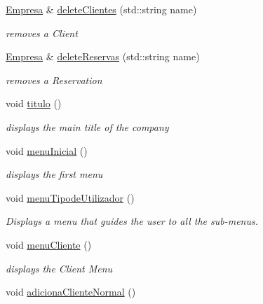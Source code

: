 \begin{DoxyCompactItemize}
\hyperlink{classEmpresa}{Empresa} \& \hyperlink{classEmpresa_a52b9f4d94c2a05704d74854ed4dd1590}{delete\+Clientes} (std\+::string name)
\begin{DoxyCompactList}\small\item\em removes a Client \end{DoxyCompactList}\item 
\hyperlink{classEmpresa}{Empresa} \& \hyperlink{classEmpresa_a079c008b006f56faac3c1016fe770e8c}{delete\+Reservas} (std\+::string name)
\begin{DoxyCompactList}\small\item\em removes a Reservation \end{DoxyCompactList}\item 
void \hyperlink{classEmpresa_ad79f7196a8ce7256771cbd7b9542155c}{titulo} ()
\begin{DoxyCompactList}\small\item\em displays the main title of the company \end{DoxyCompactList}\item 
\mbox{\label{classEmpresa_ad77cdd5a6cbe2beb2078aa6bec2cfe28}} 
void \hyperlink{classEmpresa_ad77cdd5a6cbe2beb2078aa6bec2cfe28}{menu\+Inicial} ()
\begin{DoxyCompactList}\small\item\em displays the first menu \end{DoxyCompactList}\item 
\mbox{\label{classEmpresa_a544832c17fe7d592ae1d01bdc144059e}} 
void \hyperlink{classEmpresa_a544832c17fe7d592ae1d01bdc144059e}{menu\+Tipode\+Utilizador} ()
\begin{DoxyCompactList}\small\item\em Displays a menu that guides the user to all the sub-\/menus. \end{DoxyCompactList}\item 
void \hyperlink{classEmpresa_a2e8e13ecd162403da0118ceccdccbbcb}{menu\+Cliente} ()
\begin{DoxyCompactList}\small\item\em displays the Client Menu \end{DoxyCompactList}\item 
\mbox{\label{classEmpresa_a372599c8aee20690517cc3ae6c8e1ca7}} 
void \hyperlink{classEmpresa_a372599c8aee20690517cc3ae6c8e1ca7}{adiciona\+Cliente\+Normal} ()

\end{DoxyCompactItemize}
